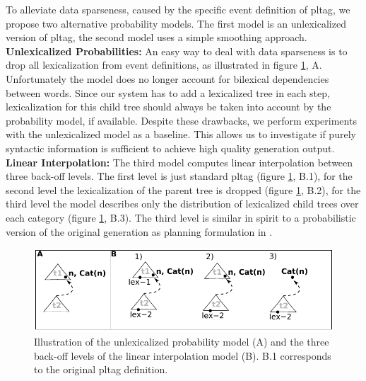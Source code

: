 To alleviate data sparseness, caused by the specific event definition of {\sc pltag}, we propose two alternative probability models. The first model is an unlexicalized version of {\sc pltag}, the second model uses a simple smoothing approach.\\ 
{\bf Unlexicalized Probabilities:}
  An easy way to deal with data sparseness is to drop all lexicalization from event definitions, as illustrated in figure \ref{fig:modelillustration}, A. Unfortunately the model does no longer account for bilexical dependencies between words. Since our system has to add a lexicalized tree in each step, lexicalization for this child tree should always be taken into account by the probability model, if available. Despite these drawbacks, we perform experiments with the unlexicalized model as a baseline. This allows us to investigate if purely syntactic information is sufficient to achieve high quality generation output. \\  
{\bf Linear Interpolation:}
 The third model computes linear interpolation between three back-off levels. The first level is just standard {\sc pltag} (figure \ref{fig:modelillustration}, B.1), for the second level the lexicalization of the parent tree is dropped (figure \ref{fig:modelillustration}, B.2), for the third level the model describes only the distribution of lexicalized child trees over each category (figure \ref{fig:modelillustration}, B.3). 
The third level is similar in spirit to a probabilistic version of the original generation as planning formulation in \cite{kollerstone2007}.
\begin{figure}[t]
\begin{center}
\includegraphics[width=.6\textwidth]{figures/modelillustration}
\caption{\label{fig:modelillustration} Illustration of the unlexicalized probability model (A) and the three back-off levels of the linear interpolation model (B). B.1 corresponds to the original {\sc pltag} definition.}

\end{center}
\end{figure}




